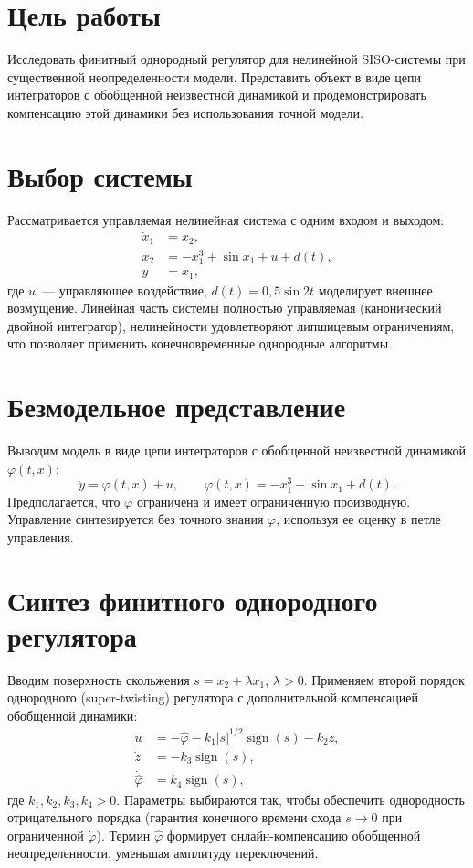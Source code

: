 \chapter{Цель работы}
Исследовать финитный однородный регулятор для нелинейной SISO-системы при существенной неопределенности модели. Представить объект в виде цепи интеграторов с обобщенной неизвестной динамикой и продемонстрировать компенсацию этой динамики без использования точной модели.

\chapter{Выбор системы}
Рассматривается управляемая нелинейная система с одним входом и выходом:
\begin{equation}
    \begin{aligned}
        \dot x_1 &= x_2,\\
        \dot x_2 &= -x_1^3 + \sin x_1 + u + d(t),\\
        y &= x_1,
    \end{aligned}
\end{equation}
где $u$~--- управляющее воздействие, $d(t)=0{,}5\sin 2t$ моделирует внешнее возмущение. Линейная часть системы полностью управляемая (канонический двойной интегратор), нелинейности удовлетворяют липшицевым ограничениям, что позволяет применить конечновременные однородные алгоритмы.

\chapter{Безмодельное представление}
Выводим модель в виде цепи интеграторов с обобщенной неизвестной динамикой $\varphi(t,x)$:
\begin{equation}
    \ddot y = \varphi(t,x) + u,\qquad \varphi(t,x) = -x_1^3 + \sin x_1 + d(t).
\end{equation}
Предполагается, что $\varphi$ ограничена и имеет ограниченную производную. Управление синтезируется без точного знания $\varphi$, используя ее оценку в петле управления.

\chapter{Синтез финитного однородного регулятора}
Вводим поверхность скольжения $s = x_2 + \lambda x_1$, $\lambda>0$. Применяем второй порядок однородного (super-twisting) регулятора с дополнительной компенсацией обобщенной динамики:
\begin{equation}
    \begin{aligned}
        u &= -\hat\varphi - k_1 |s|^{1/2}\operatorname{sign}(s) - k_2 z,\\
        \dot z &= -k_3 \operatorname{sign}(s),\\
        \dot{\hat\varphi} &= k_4 \operatorname{sign}(s),
    \end{aligned}
\end{equation}
где $k_1,k_2,k_3,k_4>0$. Параметры выбираются так, чтобы обеспечить однородность отрицательного порядка (гарантия конечного времени схода $s\to 0$ при ограниченной $\dot\varphi$). Термин $\hat\varphi$ формирует онлайн-компенсацию обобщенной неопределенности, уменьшая амплитуду переключений.

